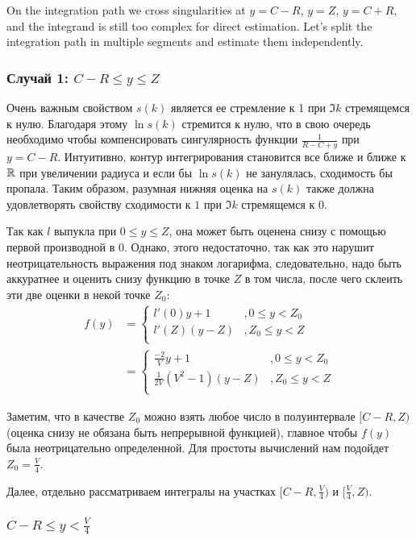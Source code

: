 On the integration path we cross singularities at $y = C - R$, $y = Z$, $y = C + R$, and the integrand is still too complex for direct estimation. Let's split the integration path in multiple segments and estimate them independently.

\subsubsection{Случай 1: $C - R \le y \le Z$}
Очень важным свойством $s(k)$ является ее стремление к 1 при $\Im k$ стремящемся к нулю. Благодаря этому $\ln s(k)$ стремится к нулю, что в свою очередь необходимо чтобы компенсировать сингулярность функции $\frac{1}{R - C + y}$ при $y = C - R$. Интуитивно, контур интегрирования становится все ближе и ближе к $\mathbb{R}$ при увеличении радиуса и если бы $\ln s(k)$ не занулялась, сходимость бы пропала. Таким образом, разумная нижняя оценка на $s(k)$ также должна удовлетворять свойству сходимости к $1$ при $\Im k$ стремящемся к $0$.

Так как $l$ выпукла при $0 \le y \le Z$, она может быть оценена снизу с помощью первой производной в $0$. Однако, этого недостаточно, так как это нарушит неотрицательность выражения под знаком логарифма, следовательно, надо быть аккуратнее и оценить снизу функцию в точке $Z$ в том числа, после чего склеить эти две оценки в некой точке $Z_0$:
\begin{align*}
f(y)
& = 
\begin{cases}
l'(0) y + 1   &, 0 \le y < Z_0  \\
l'(Z) (y - Z) &, Z_0 \le y < Z \\
\end{cases}
\\
& =
\begin{cases}
\frac{-2}{V} y + 1   &, 0 \le y < Z_0  \\
\frac{1}{2 V}(V^2 - 1) (y - Z) &, Z_0 \le y < Z \\
\end{cases}
\end{align*}

Заметим, что в качестве $Z_0$ можно взять любое число в полуинтервале $[C-R, Z)$ (оценка снизу не обязана быть непрерывной функцией), главное чтобы $f(y)$ была неотрицательно определенной. Для простоты вычислений нам подойдет $Z_0 = \frac{V}{4}$. 

Далее, отдельно рассматриваем интегралы на участках $[C - R, \frac{V}{4})$ и $[\frac{V}{4}, Z)$.

\subsubsection{$C - R \le y < \frac{V}{4}$}

